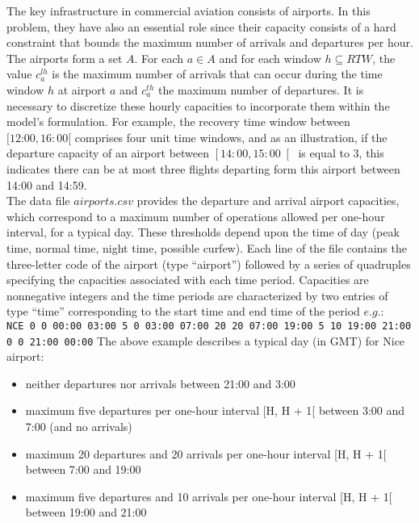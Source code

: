 \documentclass[ijoo,nonblindrev]{informs-ijoo}
\begin{document}
The key infrastructure in commercial aviation consists of airports. In this problem, they have also an essential role since their capacity consists of a hard constraint that bounds the maximum number of arrivals and departures per hour.
The airports form a set $A$. For each $a \in A$ and for each window $ h \subseteq RTW $, the value $ c_a^{lh}$ is the maximum number of arrivals that can occur during the time window $h$ at airport $a$ and $c_a^{th}$ the maximum  number of departures. It is necessary to discretize these hourly capacities to incorporate them within the model's formulation. For example, the recovery time window between $ [\text{12:00}, 16:00[ $ comprises four unit time windows, and as an illustration, if the departure capacity of an airport between $\left[ 14:00, 15:00 \right[$ is equal to $3$, this indicates there can be at most three flights departing form this airport between 14:00 and 14:59.\\
The data file $airports.csv$ provides the departure and arrival airport capacities, which correspond to a maximum number of operations allowed per one-hour interval, for a typical day. These thresholds depend upon the time of day (peak time, normal time, night time, possible curfew). Each line of the file contains the three-letter code of the airport (type “airport”) followed by a series of quadruples specifying the capacities associated with each time period. Capacities are
nonnegative integers and the time periods are characterized by two entries of type “time” corresponding to the start time and end time of the period $e.g.$:\\
\newline
{\texttt{\footnotesize NCE 0 0 00:00 03:00 5 0 03:00 07:00 20 20 07:00 19:00 5 10 19:00 21:00 0 0 21:00 00:00}}
\newline
\newline
The above example describes a typical day (in GMT) for Nice airport:
\begin{itemize}
	\item  neither departures nor arrivals between 21:00 and 3:00
	\item  maximum five departures per one-hour interval [H, H + 1[ between 3:00 and 7:00 (and no arrivals)
	\item  maximum 20 departures and 20 arrivals per one-hour interval [H, H + 1[ between 7:00 and 19:00
	\item  maximum five departures and 10 arrivals per one-hour interval [H, H + 1[ between 19:00 and 21:00
\end{itemize}
\end{document}
